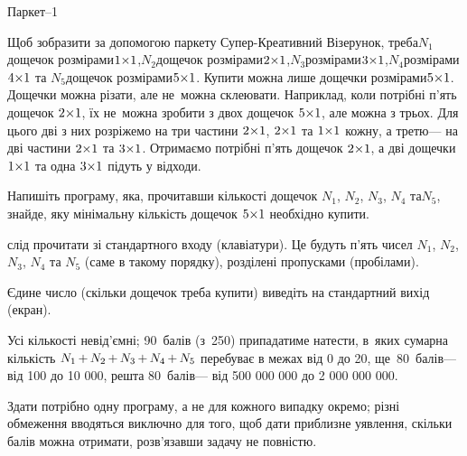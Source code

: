 \begin{problemAllDefault}{Паркет--1}

{

Щоб зобразити за допомогою паркету Супер-Креативний Візерунок, треба\linebreak[1]
$N_1$\nolinebreak[3] дощечок розмірами\nolinebreak[2] $1{\times}1$,\linebreak[1]
$N_2$\nolinebreak[3] дощечок розмірами\nolinebreak[2] $2{\times}1$,\linebreak[1]
$N_3$\nolinebreak[3] розмірами\nolinebreak[1] $3{\times}1$,\linebreak[1]
$N_4$\nolinebreak[4] розмірами\nolinebreak[1] $4{\times}1$ та 
$N_5$\nolinebreak[3] дощечок розмірами\nolinebreak[3] $5{\times}1$. 
Купити можна лише дощечки розмірами\nolinebreak[2] $5{\times}1$. Дощечки можна різати, але не~можна склеювати. Наприклад, коли потрібні п’ять дощечок $2{\times}1$, їх не~можна зробити з двох дощечок $5{\times}1$, але можна з трьох. Для цього дві з них розріжемо на три частини $2{\times}1$, $2{\times}1$ та $1{\times}1$ кожну, а третю\nolinebreak[3] --- на дві частини $2{\times}1$ та $3{\times}1$. Отримаємо потрібні п’ять дощечок $2{\times}1$, а дві дощечки $1{\times}1$ та одна $3{\times}1$ підуть у відходи.

}

Напишіть програму, яка, прочитавши кількості дощечок $N_1$, $N_2$, $N_3$, $N_4$ та\nolinebreak[3] $N_5$, знайде, яку мінімальну кількість дощечок $5{\times}1$ необхідно купити.

\InputFile	слід прочитати зі стандартного входу (клавіатури). Це будуть п’ять чисел $N_1$, $N_2$, $N_3$, $N_4$ та $N_5$ (саме в такому порядку), розділені пропусками (пробілами).

\OutputFile	Єдине число (скільки дощечок треба купити) виведіть на стандартний вихід (екран).


\Examples
\begin{exampleSimple}{5em}{3em}%
%
%
\end{exampleSimple}

\Scoring	Усі кількості невід’ємні; 90~балів (з~250) припадатиме на\nolinebreak[3] тести, в~яких сумарна кількість $N_1\dib{{+}}N_2\dib{{+}}N_3\dib{{+}}N_4\dib{{+}}N_5$ перебуває в межах від 0 до 20, ще~80~балів\nolinebreak[3] --- від 100 до 10 000, решта 80~балів\nolinebreak[3] --- від 500 000 000 до 2 000 000 000. 

Здати потрібно одну програму, а не для кожного випадку окремо; різні обмеження вводяться виключно для того, щоб дати приблизне уявлення, скільки балів можна отримати, розв’язавши задачу не повністю.



\end{problemAllDefault}